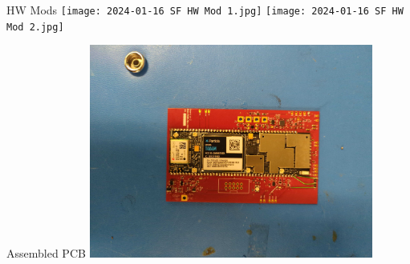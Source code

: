 \begin{frame}{HW Mods}
    \centering
    \texttt{[image: 2024-01-16 SF HW Mod 1.jpg]}
    \texttt{[image: 2024-01-16 SF HW Mod 2.jpg]}
\end{frame}
\begin{frame}{Assembled PCB}
    \centering
    \includegraphics[height=0.7\textheight,width=0.7\textwidth,keepaspectratio]{2024-01-16 SF Full PCB.jpg}
\end{frame}